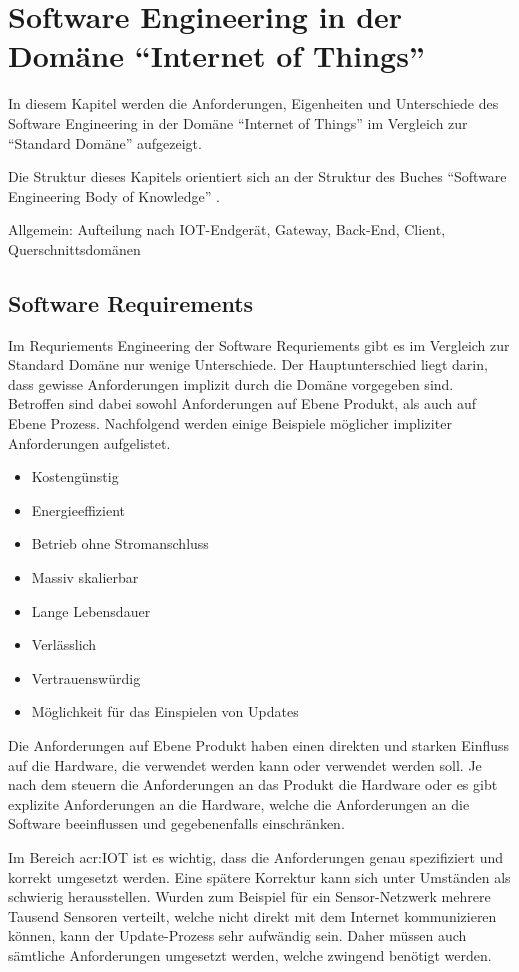 \chapter{Software Engineering in der Domäne "`Internet of Things"'} \label{chap:sweInIot}
In diesem Kapitel werden die Anforderungen, Eigenheiten und Unterschiede des Software Engineering in der Domäne "`Internet of Things"' im Vergleich zur "`Standard Domäne"' aufgezeigt.

Die Struktur dieses Kapitels orientiert sich an der Struktur des Buches "`Software Engineering Body of Knowledge"' \cite{B:IEEE:SWEBOOK}.


Allgemein: Aufteilung nach IOT-Endgerät, Gateway, Back-End, Client, Querschnittsdomänen

\section{Software Requirements}
Im Requriements Engineering der Software Requriements gibt es im Vergleich zur Standard Domäne nur wenige Unterschiede. Der Hauptunterschied liegt darin, dass gewisse Anforderungen implizit durch die Domäne vorgegeben sind. Betroffen sind dabei sowohl Anforderungen auf Ebene Produkt, als auch auf Ebene Prozess. Nachfolgend werden einige Beispiele möglicher impliziter Anforderungen aufgelistet.

\begin{itemize}
\item Kostengünstig
\item Energieeffizient
\item Betrieb ohne Stromanschluss
\item Massiv skalierbar
\item Lange Lebensdauer
\item Verlässlich
\item Vertrauenswürdig
\item Möglichkeit für das Einspielen von Updates
\end{itemize}

Die Anforderungen auf Ebene Produkt haben einen direkten und starken Einfluss auf die Hardware, die verwendet werden kann oder verwendet werden soll. Je nach dem steuern die Anforderungen an das Produkt die Hardware oder es gibt explizite Anforderungen an die Hardware, welche die Anforderungen an die Software beeinflussen und gegebenenfalls einschränken. 

Im Bereich \gls{acr:IOT} ist es wichtig, dass die Anforderungen genau spezifiziert und korrekt umgesetzt werden. Eine spätere Korrektur kann sich unter Umständen als schwierig herausstellen. Wurden zum Beispiel für ein Sensor-Netzwerk mehrere Tausend Sensoren verteilt, welche nicht direkt mit dem Internet kommunizieren können, kann der Update-Prozess sehr aufwändig sein. Daher müssen auch sämtliche Anforderungen umgesetzt werden, welche zwingend benötigt werden.

